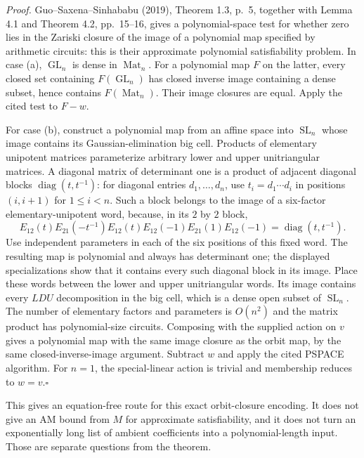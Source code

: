 \documentclass[11pt,a4paper]{article}
\begin{document}
\emph{Proof.} Guo--Saxena--Sinhababu (2019), Theorem 1.3, p.~5, together
with Lemma 4.1 and Theorem 4.2, pp.~15--16, gives a polynomial-space test
for whether zero lies in the Zariski closure of the image of a polynomial
map specified by arithmetic circuits: this is their approximate polynomial
satisfiability problem. In case (a), $\operatorname{GL}_n$ is dense in
$\operatorname{Mat}_n$. For a polynomial map $F$ on the latter, every closed
set containing $F(\operatorname{GL}_n)$ has closed inverse image containing
a dense subset, hence contains $F(\operatorname{Mat}_n)$. Their image
closures are equal. Apply the cited test to $F-w$.

For case (b), construct a polynomial map from an affine space into
$\operatorname{SL}_n$ whose image contains its Gaussian-elimination big
cell. Products of elementary unipotent matrices parameterize arbitrary
lower and upper unitriangular matrices. A diagonal matrix of determinant
one is a product of adjacent diagonal blocks
$\operatorname{diag}(t,t^{-1})$: for diagonal entries $d_1,\ldots,d_n$,
use $t_i=d_1\cdots d_i$ in positions $(i,i+1)$ for $1\leq i<n$.
Such a block belongs to the image of a
six-factor elementary-unipotent word, because, in its $2$ by $2$ block,
\[
 E_{12}(t)E_{21}(-t^{-1})E_{12}(t)
 E_{12}(-1)E_{21}(1)E_{12}(-1)
       =\operatorname{diag}(t,t^{-1}).
\]
Use independent parameters in each of the six positions of this fixed
word. The resulting map is polynomial and always has determinant one;
the displayed specializations show that it contains every such diagonal
block in its image. Place these words between the lower and upper
unitriangular words. Its image contains every $LDU$ decomposition in the
big cell, which is a dense open subset of $\operatorname{SL}_n$.
The number of elementary factors and parameters is $O(n^2)$ and the
matrix product has polynomial-size circuits. Composing with the supplied
action on $v$ gives a polynomial map with the same image closure as the
orbit map, by the same closed-inverse-image argument. Subtract $w$ and
apply the cited PSPACE algorithm. For $n=1$, the special-linear action is
trivial and membership reduces to $w=v$.\hfill$\square$

This gives an equation-free route for this exact orbit-closure encoding.
It does not give an AM bound from $M$ for approximate satisfiability, and
it does not turn an exponentially long list of ambient coefficients into
a polynomial-length input. Those are separate questions from the theorem.
\end{document}
